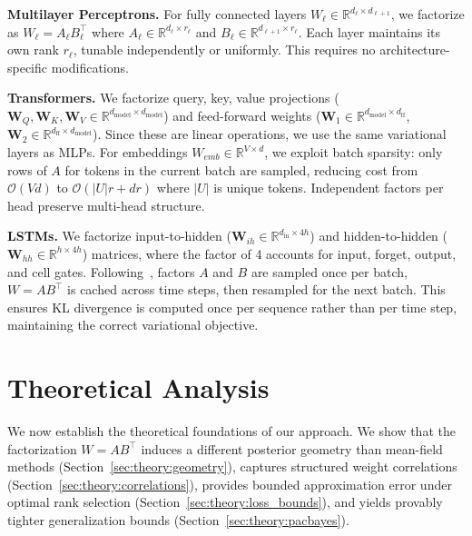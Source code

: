 \documentclass{article}
\theoremstyle{plain}
\theoremstyle{definition}
\theoremstyle{remark}
\begin{document}
\noindent \textbf{Multilayer Perceptrons.}
For fully connected layers $W_\ell \in \mathbb{R}^{d_{\ell} \times d_{\ell+1}}$, we factorize as $W_\ell = A_\ell B_\ell^\top$ where $A_\ell \in \mathbb{R}^{d_{\ell} \times r_\ell}$ and $B_\ell \in \mathbb{R}^{d_{\ell+1} \times r_\ell}$. Each layer maintains its own rank $r_\ell$, tunable independently or uniformly. This requires no architecture-specific modifications.

\noindent \textbf{Transformers.}
We factorize query, key, value projections ($\mathbf{W}_Q, \mathbf{W}_K, \mathbf{W}_V \in \mathbb{R}^{d_{\text{model}} \times d_{\text{model}}}$) and feed-forward weights ($\mathbf{W}_1 \in \mathbb{R}^{d_{\text{model}} \times d_{\text{ff}}}$, $\mathbf{W}_2 \in \mathbb{R}^{d_{\text{ff}} \times d_{\text{model}}}$). Since these are linear operations, we use the same variational layers as MLPs. For embeddings $W_{emb} \in \mathbb{R}^{V \times d}$, we exploit batch sparsity: only rows of $A$ for tokens in the current batch are sampled, reducing cost from $\mathcal{O}(Vd)$ to $\mathcal{O}(|U|r + dr)$ where $|U|$ is unique tokens. Independent factors per head preserve multi-head structure.

\noindent \textbf{LSTMs.}
We factorize input-to-hidden ($\mathbf{W}_{ih} \in \mathbb{R}^{d_{\text{in}} \times 4h}$) and hidden-to-hidden ($\mathbf{W}_{hh} \in \mathbb{R}^{h \times 4h}$) matrices, where the factor of 4 accounts for input, forget, output, and cell gates. Following~\citet{fortunato2017bayesian}, factors $A$ and $B$ are sampled once per batch, $W = AB^\top$ is cached across time steps, then resampled for the next batch. This ensures KL divergence is computed once per sequence rather than per time step, maintaining the correct variational objective. %

\section{Theoretical Analysis}
\label{sec:theory}
We now establish the theoretical foundations of our approach. We show that the factorization $W = AB^\top$ induces a different posterior 
geometry than mean-field methods (Section~\ref{sec:theory:geometry}),
captures 
structured 
weight correlations (Section~\ref{sec:theory:correlations}), 
provides 
bounded approximation error under optimal rank selection 
(Section~\ref{sec:theory:loss_bounds}), and yields provably tighter 
generalization bounds (Section~\ref{sec:theory:pacbayes}).
\end{document}

